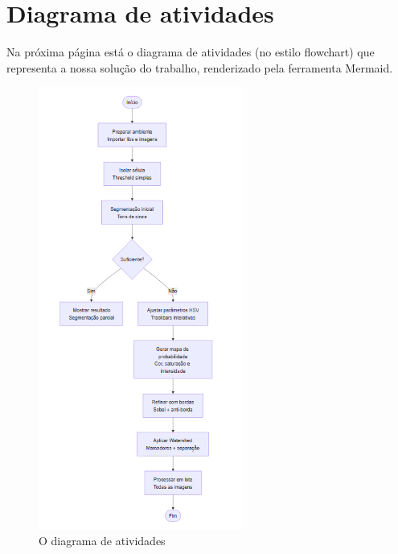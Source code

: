 \documentclass{article}
\begin{document}
\section{Diagrama de atividades}

Na próxima página está o diagrama de atividades (no estilo flowchart) que representa a nossa solução do trabalho, renderizado pela ferramenta Mermaid.

\begin{figure}[h!]
    \centering
    \includegraphics[width=0.6\textwidth]{diagrama.png}
    \caption{O diagrama de atividades}
    \label{fig:exemplo}
\end{figure}
\end{document}
